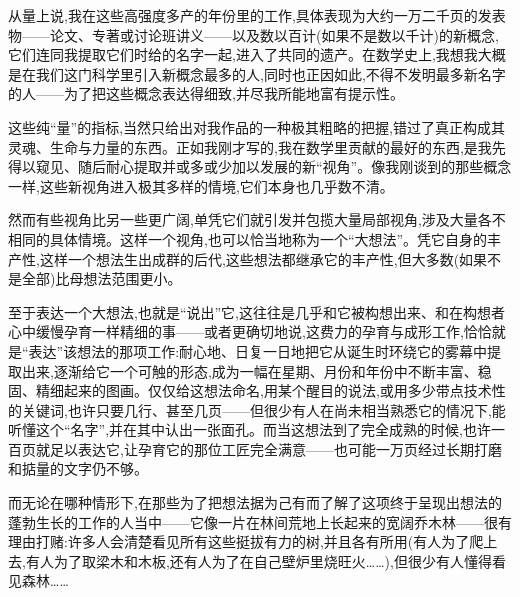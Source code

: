 从量上说,我在这些高强度多产的年份里的工作,具体表现为大约一万二千页的发表物——论文、专著或讨论班讲义——以及数以百计(如果不是数以千计)的新概念,它们连同我提取它们时给的名字一起,进入了共同的遗产。在数学史上,我想我大概是在我们这门科学里引入新概念最多的人,同时也正因如此,不得不发明最多新名字的人——为了把这些概念表达得细致,并尽我所能地富有提示性。

这些纯“量”的指标,当然只给出对我作品的一种极其粗略的把握,错过了真正构成其灵魂、生命与力量的东西。正如我刚才写的,我在数学里贡献的最好的东西,是我先得以窥见、随后耐心提取并或多或少加以发展的新“视角”。像我刚谈到的那些概念一样,这些新视角进入极其多样的情境,它们本身也几乎数不清。

然而有些视角比另一些更广阔,单凭它们就引发并包揽大量局部视角,涉及大量各不相同的具体情境。这样一个视角,也可以恰当地称为一个“大想法”。凭它自身的丰产性,这样一个想法生出成群的后代,这些想法都继承它的丰产性,但大多数(如果不是全部)比母想法范围更小。

至于表达一个大想法,也就是“说出”它,这往往是几乎和它被构想出来、和在构想者心中缓慢孕育一样精细的事——或者更确切地说,这费力的孕育与成形工作,恰恰就是“表达”该想法的那项工作:耐心地、日复一日地把它从诞生时环绕它的雾幕中提取出来,逐渐给它一个可触的形态,成为一幅在星期、月份和年份中不断丰富、稳固、精细起来的图画。仅仅给这想法命名,用某个醒目的说法,或用多少带点技术性的关键词,也许只要几行、甚至几页——但很少有人在尚未相当熟悉它的情况下,能听懂这个“名字”,并在其中认出一张面孔。而当这想法到了完全成熟的时候,也许一百页就足以表达它,让孕育它的那位工匠完全满意——也可能一万页经过长期打磨和掂量的文字仍不够。

而无论在哪种情形下,在那些为了把想法据为己有而了解了这项终于呈现出想法的蓬勃生长的工作的人当中——它像一片在林间荒地上长起来的宽阔乔木林——很有理由打赌:许多人会清楚看见所有这些挺拔有力的树,并且各有所用(有人为了爬上去,有人为了取梁木和木板,还有人为了在自己壁炉里烧旺火……),但很少有人懂得看见森林……

